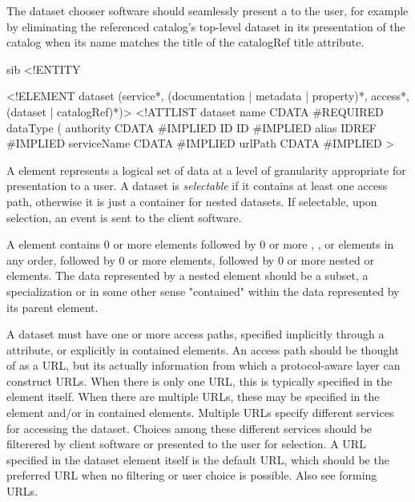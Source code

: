 The dataset chooser software should seamlessly present a
 to the user, for example by eliminating the
referenced catalog's top-level dataset in its presentation of the
catalog when its name matches the title of the catalogRef title
attribute.

 

\begin{vcode}{sib}
<!ENTITY %

<!ELEMENT dataset (service*, (documentation | metadata | property)*, access*, (dataset | catalogRef)*)>
<!ATTLIST dataset
    name CDATA #REQUIRED
    dataType (%
    authority CDATA #IMPLIED
    ID ID #IMPLIED
    alias IDREF #IMPLIED
    serviceName CDATA #IMPLIED
    urlPath CDATA #IMPLIED
>
\end{vcode}

A  element represents a logical set of data at a
level of granularity appropriate for presentation to a user. A dataset
is \emph{selectable} if it contains at least one access path,
otherwise it is just a container for nested datasets. If selectable,
upon selection, an event is sent to the client software.

A  element contains 0 or more 
elements followed by 0 or more ,
, or  elements in any order,
followed by 0 or more  elements, followed by 0 or more
nested  or  elements.  The data
represented by a nested  element should be a subset,
a specialization or in some other sense "contained" within the data
represented by its parent  element.

A dataset must have one or more access paths, specified implicitly
through a  attribute, or explicitly in contained
 elements.  An access path should be thought of as a
URL, but its actually information from which a protocol-aware layer
can construct URLs.  When there is only one URL, this is typically
specified in the  element itself. When there are
multiple URLs, these may be specified in the  element
and/or in contained  elements.  Multiple URLs specify
different services for accessing the dataset.  Choices among these
different services should be filterered by client software or
presented to the user for selection.  A URL specified in the dataset
element itself is the default URL, which should be the preferred URL
when no filtering or user choice is possible. Also see forming URLs.

